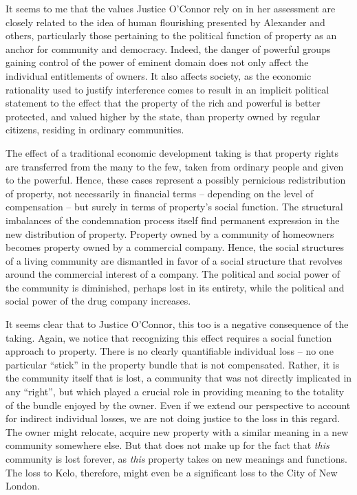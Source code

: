 \begin{quote}

\end{quote}

It seems to me that the values Justice O'Connor rely on in her assessment are closely related to the idea of human flourishing presented by Alexander and others, particularly those pertaining to the political function of property as an anchor for community and democracy. Indeed, the danger of powerful groups gaining control of the power of eminent domain does not only affect the individual entitlements of owners. It also affects society, as the economic rationality used to justify interference comes to result in an implicit political statement to the effect that the property of the rich and powerful is better protected, and valued higher by the state, than property owned by regular citizens, residing in ordinary communities.

The effect of a traditional economic development taking is that property rights are transferred from the many to the few, taken from ordinary people and given to the powerful. Hence, these cases represent a possibly pernicious redistribution of property, not necessarily in financial terms -- depending on the level of compensation -- but surely in terms of property's social function. The structural imbalances of the condemnation process itself find permanent expression in the new distribution of property. Property owned by a community of homeowners becomes property owned by a commercial company. Hence, the social structures of a living community are dismantled in favor of a social structure that revolves around the commercial interest of a company. The political and social power of the community is diminished, perhaps lost in its entirety, while the political and social power of the drug company increases.

It seems clear that to Justice O'Connor, this too is a negative consequence of the taking. Again, we notice that recognizing this effect requires a social function approach to property. There is no clearly quantifiable individual loss -- no one particular ``stick'' in the property bundle that is not compensated. Rather, it is the community itself that is lost, a community that was not directly implicated in any ``right'', but which played a crucial role in providing meaning to the totality of the bundle enjoyed by the owner. Even if we extend our perspective to account for indirect individual losses, we are not doing justice to the loss in this regard. The owner might relocate, acquire new property with a similar meaning in a new community somewhere else. But that does not make up for the fact that {\it this} community is lost forever, as {\it this} property takes on new meanings and functions. The loss to Kelo, therefore, might  even be a significant loss to the City of New London.

